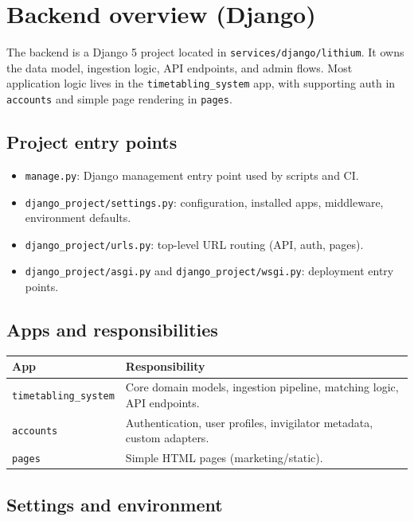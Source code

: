 \section{Backend overview (Django)}
\label{sec:backend}

The backend is a Django 5 project located in \texttt{services/django/lithium}. It owns the data model, ingestion logic, API endpoints, and admin flows. Most application logic lives in the \texttt{timetabling\_system} app, with supporting auth in \texttt{accounts} and simple page rendering in \texttt{pages}.

\subsection{Project entry points}
\label{subsec:backend:entrypoints}

\begin{itemize}
  \item \texttt{manage.py}: Django management entry point used by scripts and CI.
  \item \texttt{django\_project/settings.py}: configuration, installed apps, middleware, environment defaults.
  \item \texttt{django\_project/urls.py}: top-level URL routing (API, auth, pages).
  \item \texttt{django\_project/asgi.py} and \texttt{django\_project/wsgi.py}: deployment entry points.
\end{itemize}

\subsection{Apps and responsibilities}
\label{subsec:backend:apps}

\begin{longtable}{p{}p{}}
\toprule
\textbf{App} & \textbf{Responsibility} \\
\midrule
\texttt{timetabling\_system} & Core domain models, ingestion pipeline, matching logic, API endpoints. \\
\texttt{accounts} & Authentication, user profiles, invigilator metadata, custom adapters. \\
\texttt{pages} & Simple HTML pages (marketing/static). \\
\bottomrule
\end{longtable}

\subsection{Settings and environment}
\label{subsec:backend:settings}

